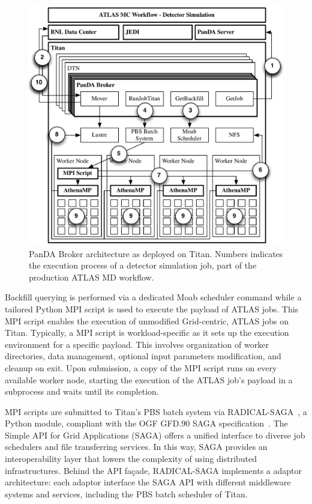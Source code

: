 \begin{figure}
    \centering
    \includegraphics[width=\columnwidth]{figures/panda_broker_architecture.pdf}
    \caption{PanDA Broker architecture as deployed on Titan. Numbers indicates
    the execution process of a detector simulation job, part of the production
    ATLAS MD workflow.}
\label{fig:panda_broker}
\end{figure}

Backfill querying is performed via a dedicated Moab scheduler command while a
tailored Python MPI script is used to execute the payload of ATLAS jobs. This
MPI script enables the execution of unmodified Grid-centric, ATLAS jobs on
Titan. Typically, a MPI script is workload-specific as it sets up the execution
environment for a specific payload. This involves organization of worker
directories, data management, optional input parameters modification, and
cleanup on exit. Upon submission, a copy of the MPI script runs on every
available worker node, starting the execution of the ATLAS job's payload in a
subprocess and waits until its completion.

MPI scripts are submitted to Titan's PBS batch system via
RADICAL-SAGA~\cite{radical-saga_url}, a Python module, compliant with the OGF
GFD.90 SAGA specification~\cite{goodale2008simple}. The Simple API for Grid
Applications (SAGA) offers a unified interface to diverse job schedulers and
file transferring services. In this way, SAGA provides an interoperability layer
that lowers the complexity of using distributed infrastructures. Behind the API
façade, RADICAL-SAGA implements a adaptor architecture: each adaptor interface
the SAGA API with different middleware systems and services, including the PBS
batch scheduler of Titan.

